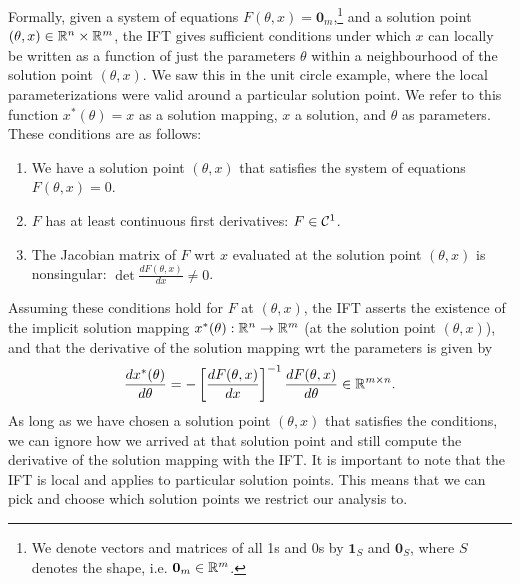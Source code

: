 \documentclass[11pt]{article}
\begin{document}
Formally, given a system of equations $F(\theta, x) = \mathbf{0}_m$,\footnote{
We denote vectors and matrices of all 1s and 0s by $\mathbf{1}_S$
and $\mathbf{0}_S$, where $S$ denotes the shape, i.e. $\mathbf{0}_m\in\mathbb{R}^m$.
}
and a solution point $(\theta,x) \in \mathbb{R}^n\times\mathbb{R}^m$,
the IFT gives sufficient conditions under which $x$ can locally be written as a function
of just the parameters $\theta$ within a neighbourhood of the solution point $(\theta,x)$.
We saw this in the unit circle example, where the local parameterizations were
valid around a particular solution point.
We refer to this function $x^*(\theta) = x$ as a solution mapping,
$x$ a solution, and $\theta$ as parameters.
These conditions are as follows:
\begin{enumerate}
\item We have a solution point $(\theta, x)$ that satisfies the system of equations
    $F(\theta, x) = 0$.
\item $F$ has at least continuous first derivatives: $F \in \mathcal{C}^1$.
\item The Jacobian matrix
    of $F$ wrt $x$ evaluated at the solution point $(\theta,x)$ is nonsingular:
    $\det \frac{d F(\theta,x)}{d x} \neq 0$.
\end{enumerate}
Assuming these conditions hold for $F$ at $(\theta,x)$, the IFT
asserts the existence of the implicit solution mapping $x^*(\theta):\mathbb{R}^n\to\mathbb{R}^m$
(at the solution point $(\theta,x)$),
and that the derivative of the solution mapping wrt the parameters is given by
\begin{equation}
    \label{eqn:iftderiv}
    \frac{d x^*(\theta)}{d\theta} = -\left[\frac{dF(\theta,x)}{dx}\right]^{-1}
    \frac{d F(\theta,x)}{d\theta} \in \mathbb{R}^{m\times n}.
\end{equation}
As long as we have chosen a solution point $(\theta,x)$ that satisfies the conditions,
we can ignore how we arrived at that solution point and still compute the derivative
of the solution mapping with the IFT.
It is important to note that the IFT is local and applies to particular solution points.
This means that we can pick and choose which solution points we restrict our analysis to.
\end{document}
